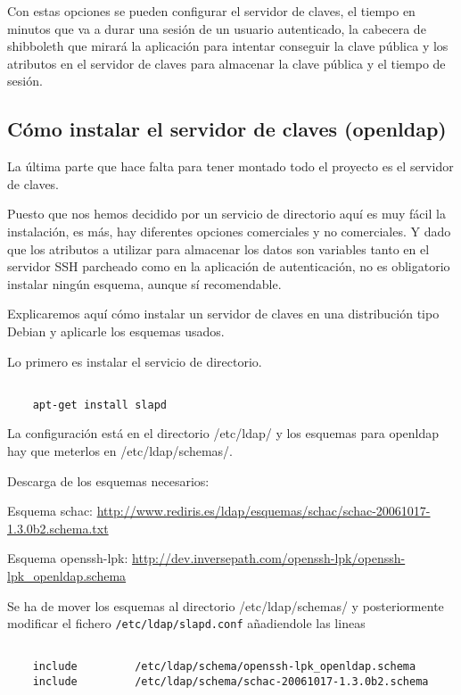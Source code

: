     Con estas opciones se pueden configurar el servidor de
    claves, el tiempo en minutos que va a durar una sesión de un
    usuario autenticado, la cabecera de shibboleth que mirará la
    aplicación para intentar conseguir la clave pública y los
    atributos en el servidor de claves para almacenar la clave
    pública y el tiempo de sesión.

\subsection{Cómo instalar el servidor de claves (openldap)}

    La última parte que hace falta para tener montado todo el
    proyecto es el servidor de claves.

    Puesto que nos hemos decidido por un servicio de directorio
    aquí es muy fácil la instalación, es más, hay diferentes
    opciones comerciales y no comerciales. Y dado que los
    atributos a utilizar para almacenar los datos son variables
    tanto en el servidor SSH parcheado como en la aplicación de
    autenticación, no es obligatorio instalar ningún esquema,
    aunque sí recomendable.

    Explicaremos aquí cómo instalar un servidor de claves en una
    distribución tipo Debian y aplicarle los esquemas usados.

    Lo primero es instalar el servicio de directorio.

    \begin{verbatim}

    apt-get install slapd

    \end{verbatim}

    La configuración está en el directorio /etc/ldap/ y los
    esquemas para openldap hay que meterlos en /etc/ldap/schemas/.

    Descarga de los esquemas necesarios:

    Esquema schac: 
    \url{http://www.rediris.es/ldap/esquemas/schac/schac-20061017-1.3.0b2.schema.txt}

    Esquema openssh-lpk:
    \url{http://dev.inversepath.com/openssh-lpk/openssh-lpk\_openldap.schema}


    Se ha de mover los esquemas al directorio /etc/ldap/schemas/ y
    posteriormente modificar el fichero
    \texttt{/etc/ldap/slapd.conf} añadiendole las lineas

    \begin{verbatim}

    include         /etc/ldap/schema/openssh-lpk_openldap.schema
    include         /etc/ldap/schema/schac-20061017-1.3.0b2.schema

    \end{verbatim}

